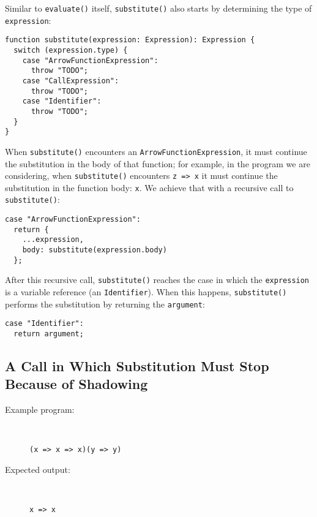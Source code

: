 \documentclass[12pt, oneside]{book}
\begin{document}
Similar to \texttt{evaluate()} itself, \texttt{substitute()} also starts by determining the type of \texttt{expression}:

\begin{verbatim}
function substitute(expression: Expression): Expression {
  switch (expression.type) {
    case "ArrowFunctionExpression":
      throw "TODO";
    case "CallExpression":
      throw "TODO";
    case "Identifier":
      throw "TODO";
  }
}
\end{verbatim}

When \texttt{substitute()} encounters an \texttt{ArrowFunctionExpression}, it must continue the substitution in the body of that function; for example, in the program we are considering, when \texttt{substitute()} encounters \texttt{z => x} it must continue the substitution in the function body: \texttt{x}. We achieve that with a recursive call to \texttt{substitute()}:

\begin{verbatim}
case "ArrowFunctionExpression":
  return {
    ...expression,
    body: substitute(expression.body)
  };
\end{verbatim}

After this recursive call, \texttt{substitute()} reaches the case in which the \texttt{expression} is a variable reference (an \texttt{Identifier}). When this happens, \texttt{substitute()} performs the substitution by returning the \texttt{argument}:

\begin{verbatim}
case "Identifier":
  return argument;
\end{verbatim}

\subsection{A Call in Which Substitution Must Stop Because of Shadowing}

\begin{description}
\item [Example program:] ~

\begin{verbatim}
(x => x => x)(y => y)
\end{verbatim}

\item [Expected output:] ~

\begin{verbatim}
x => x
\end{verbatim}
\end{description}
\end{document}
